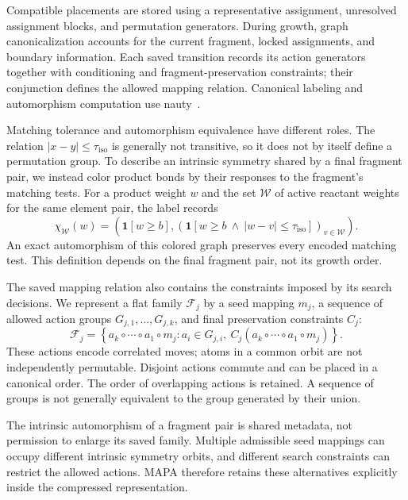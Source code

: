 Compatible placements are stored using a representative assignment, unresolved assignment blocks, and permutation generators. During growth, graph canonicalization accounts for the current fragment, locked assignments, and boundary information. Each saved transition records its action generators together with conditioning and fragment-preservation constraints; their conjunction defines the allowed mapping relation. Canonical labeling and automorphism computation use nauty~\citep{mckay2014}.

Matching tolerance and automorphism equivalence have different roles. The relation $|x-y|\leq\tau_{\mathrm{iso}}$ is generally not transitive, so it does not by itself define a permutation group. To describe an intrinsic symmetry shared by a final fragment pair, we instead color product bonds by their responses to the fragment's matching tests. For a product weight $w$ and the set $\mathcal W$ of active reactant weights for the same element pair, the label records
\begin{equation}
 \chi_{\mathcal W}(w)=\left(\mathbf 1[w\geq b],
 \left(\mathbf 1[w\geq b\ \land\ |w-v|\leq\tau_{\mathrm{iso}}]\right)_{v\in\mathcal W}\right).
 \label{eq:response}
\end{equation}
An exact automorphism of this colored graph preserves every encoded matching test. This definition depends on the final fragment pair, not its growth order.

The saved mapping relation also contains the constraints imposed by its search decisions. We represent a flat family $\mathcal F_j$ by a seed mapping $m_j$, a sequence of allowed action groups $G_{j,1},\ldots,G_{j,k}$, and final preservation constraints $C_j$:
\begin{equation}
 \mathcal F_j=\left\{a_k\circ\cdots\circ a_1\circ m_j:
 a_i\in G_{j,i},\ C_j(a_k\circ\cdots\circ a_1\circ m_j)\right\}.
 \label{eq:family}
\end{equation}
These actions encode correlated moves; atoms in a common orbit are not independently permutable. Disjoint actions commute and can be placed in a canonical order. The order of overlapping actions is retained. A sequence of groups is not generally equivalent to the group generated by their union.

The intrinsic automorphism of a fragment pair is shared metadata, not permission to enlarge its saved family. Multiple admissible seed mappings can occupy different intrinsic symmetry orbits, and different search constraints can restrict the allowed actions. MAPA therefore retains these alternatives explicitly inside the compressed representation.

